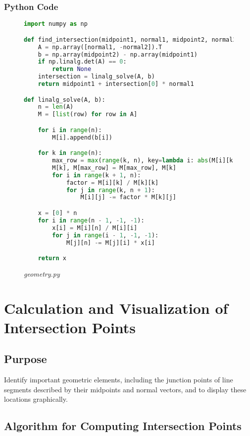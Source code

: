 \documentclass[12pt,a4paper]{report}
\begin{document}
\subsubsection{Python Code}
\begin{figure}[ht!]
\centering
\caption{\large\textit{geometry.py}}
\begin{lstlisting}[language=Python, caption={Intersection Calculation with Custom Linear Solver}]
import numpy as np

def find_intersection(midpoint1, normal1, midpoint2, normal2):
    A = np.array([normal1, -normal2]).T
    b = np.array(midpoint2) - np.array(midpoint1)
    if np.linalg.det(A) == 0:
        return None
    intersection = linalg_solve(A, b)
    return midpoint1 + intersection[0] * normal1

def linalg_solve(A, b):
    n = len(A)
    M = [list(row) for row in A]

    for i in range(n):
        M[i].append(b[i])

    for k in range(n):
        max_row = max(range(k, n), key=lambda i: abs(M[i][k]))
        M[k], M[max_row] = M[max_row], M[k]
        for i in range(k + 1, n):
            factor = M[i][k] / M[k][k]
            for j in range(k, n + 1):
                M[i][j] -= factor * M[k][j]

    x = [0] * n
    for i in range(n - 1, -1, -1):
        x[i] = M[i][n] / M[i][i]
        for j in range(i - 1, -1, -1):
            M[j][n] -= M[j][i] * x[i]

    return x
\end{lstlisting}
\end{figure}

\section{Calculation and Visualization of Intersection Points}

\subsection{Purpose}
Identify important geometric elements, including the junction points of line segments described by their midpoints and normal vectors, and to display these locations graphically.


\subsection{Algorithm for Computing Intersection Points}
\end{document}
